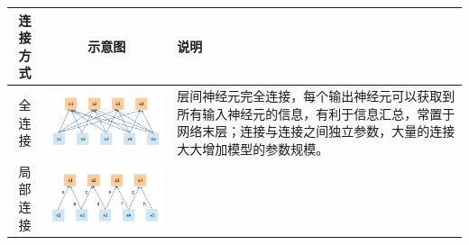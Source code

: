 \begin{longtable}[]{@{}ccl@{}}
\toprule
\begin{minipage}[b]{0.11\columnwidth}\centering\strut
连接方式\strut
\end{minipage} & \begin{minipage}[b]{0.08\columnwidth}\centering\strut
示意图\strut
\end{minipage} & \begin{minipage}[b]{0.06\columnwidth}\raggedright\strut
说明\strut
\end{minipage}\tabularnewline
\midrule
\endhead
\begin{minipage}[t]{0.11\columnwidth}\centering\strut
全连接\strut
\end{minipage} & \begin{minipage}[t]{0.08\columnwidth}\centering\strut
\includegraphics{img/ch5/full-connected.png}\strut
\end{minipage} & \begin{minipage}[t]{0.06\columnwidth}\raggedright\strut
层间神经元完全连接，每个输出神经元可以获取到所有输入神经元的信息，有利于信息汇总，常置于网络末层；连接与连接之间独立参数，大量的连接大大增加模型的参数规模。\strut
\end{minipage}\tabularnewline
\begin{minipage}[t]{0.11\columnwidth}\centering\strut
局部连接\strut
\end{minipage} & \begin{minipage}[t]{0.08\columnwidth}\centering\strut
\includegraphics{img/ch5/local-connected.png}\strut

\end{minipage}
\end{longtable}
